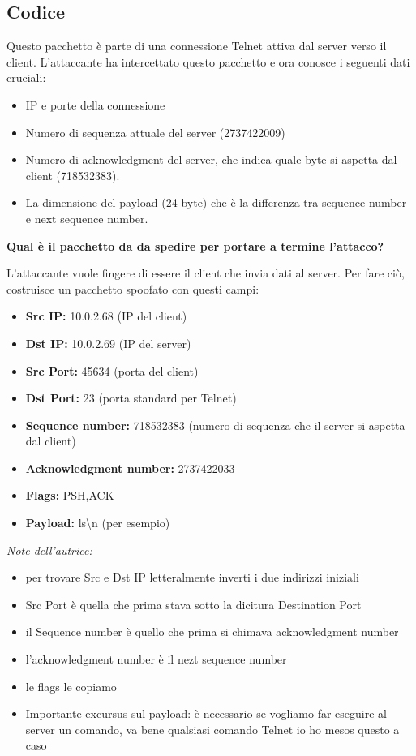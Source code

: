 \documentclass{report}
\begin{document}
\subsection{Codice}
Questo pacchetto è parte di una connessione Telnet attiva dal server verso il client. L'attaccante ha intercettato questo pacchetto e ora conosce i seguenti dati cruciali:
\begin{itemize}
    \item IP e porte della connessione
    \item Numero di sequenza attuale del server (2737422009)
    \item Numero di acknowledgment del server, che indica quale byte si aspetta dal client (718532383).
    \item La dimensione del payload (24 byte) che è la differenza tra sequence number e next sequence number.
\end{itemize}

\begin{center}
    \textbf{Qual è il pacchetto da da spedire per portare a termine l'attacco?}
\end{center}
\noindent L'attaccante vuole fingere di essere il client che invia dati al server. Per fare ciò, costruisce un pacchetto spoofato con questi campi:
\begin{itemize}
    \item \textbf{Src IP:} 10.0.2.68 (IP del client)
    \item \textbf{Dst IP:} 10.0.2.69 (IP del server)
    \item \textbf{Src Port:} 45634 (porta del client)
    \item \textbf{Dst Port:} 23 (porta standard per Telnet)
    \item \textbf{Sequence number:} 718532383 (numero di sequenza che il server si aspetta dal client)
    \item \textbf{Acknowledgment number:} 2737422033
    \item \textbf{Flags:} PSH,ACK
    \item \textbf{Payload:} ls\textbackslash n (per esempio)
\end{itemize}

\noindent \textit{Note dell'autrice:} 
\begin{itemize}
    \item per trovare Src e Dst IP letteralmente inverti i due indirizzi iniziali
    \item Src Port è quella che prima stava sotto la dicitura Destination Port
    \item il Sequence number è quello che prima si chimava acknowledgment number 
    \item l'acknowledgment number è il nezt sequence number
    \item le flags le copiamo
    \item Importante excursus sul payload: è necessario se vogliamo far eseguire al server un comando, va bene qualsiasi comando Telnet io ho mesos questo a caso
\end{itemize}
\end{document}
